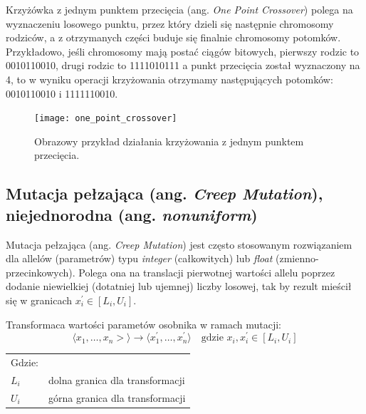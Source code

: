 \documentclass[a4paper,11pt]{article}
\begin{document}
    Krzyżówka z jednym punktem przecięcia (ang. \textit{One Point Crossover}) polega na wyznaczeniu losowego punktu, przez który dzieli się następnie chromosomy rodziców, a z otrzymanych części buduje się finalnie chromosomy potomków. Przykładowo, jeśli chromosomy mają postać ciągów bitowych, pierwszy rodzic to 0010110010, drugi rodzic to 1111010111 a punkt przecięcia został wyznaczony na 4, to w wyniku operacji krzyżowania otrzymamy następujących potomków: 0010110010 i 1111110010\cite{GeneticAlgorithmEssentials2017}.

    \bigskip

    \begin{figure}[H]
        \label{fig:one_point_crossover}
        \centering
        \texttt{[image: one\_point\_crossover]}
        \caption{Obrazowy przykład działania krzyżowania z jednym punktem przecięcia.}
    \end{figure}

    \subsection{Mutacja pełzająca (ang. \textit{Creep Mutation}), niejednorodna (ang. \textit{nonuniform})}

    Mutacja pełzająca (ang. \textit{Creep Mutation}) jest często stosowanym rozwiązaniem dla allelów (parametrów) typu \textit{integer} (całkowitych) lub \textit{float} (zmienno-przecinkowych). Polega ona na translacji pierwotnej wartości allelu poprzez dodanie niewielkiej (dotatniej lub ujemnej) liczby losowej, tak by rezult mieścił się w granicach $x_{i}^{'} \in [L_{i}, U_{i}]$\cite{IntroductionToEvolutionaryComputing2015}.

    \bigskip

    Transformaca wartości parametów osobnika w ramach mutacji: \\
    \begin{equation}
        \label{equ:mutation_transformation}
        \langle x_{1},\dotsc,x_{n}> \rangle \to \langle x_{1}^{'},\dotsc,x_{n}^{'} \rangle \quad \text{gdzie } x_{i}, x_{i}^{'} \in [L_{i}, U_{i}]
    \end{equation}

    \smallskip

    \begin{tabular}{p{}p{}}
        Gdzie: \\
        $L_{i}$ & dolna granica dla transformacji \\
        $U_{i}$ & górna granica dla transformacji \\
    \end{tabular}
\end{document}
